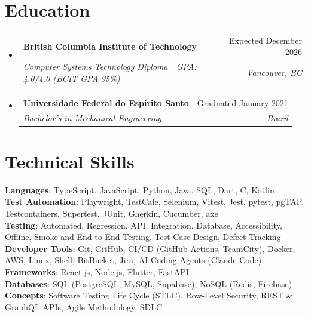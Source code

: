 \documentclass[letterpaper,11pt]{article}
\makeatletter
\newcommand{\resumeSubheading}[4]{
  \vspace{-2pt}\item
    \begin{tabular*}{0.97\textwidth}[t]{l@{\extracolsep{\fill}}r}
      \textbf{#1} & #2 \\
      \textit{\small#3} & \textit{\small #4} \\
    \end{tabular*}\vspace{-7pt}
}
\newcommand{\resumeSubHeadingListStart}{\begin{itemize}[leftmargin=0.15in, label={}]}
\newcommand{\resumeSubHeadingListEnd}{\end{itemize}}
\makeatother
\begin{document}
\section{Education}
  \resumeSubHeadingListStart
    \resumeSubheading
      {British Columbia Institute of Technology}{Expected December 2026}
      {Computer Systems Technology Diploma $|$ \textup{GPA: 4.0/4.0 (BCIT GPA 95\%)}}{Vancouver, BC}
    \resumeSubheading
      {Universidade Federal do Espirito Santo}{Graduated January 2021}
      {Bachelor's in Mechanical Engineering}{Brazil}
  \resumeSubHeadingListEnd


%
\section{Technical Skills}
 \begin{itemize}[leftmargin=0.15in, label={}]
    \small{\item{
     \textbf{Languages}{: TypeScript, JavaScript, Python, Java, SQL, Dart, C, Kotlin} \\

    \textbf{Test Automation}{: Playwright, TestCafe, Selenium, Vitest, Jest, pytest, pgTAP, Testcontainers, Supertest, JUnit, Gherkin, Cucumber, axe} \\

    \textbf{Testing}{: Automated, Regression, API, Integration, Database, Accessibility, Offline, Smoke and End-to-End Testing, Test Case Design, Defect Tracking} \\

    \textbf{Developer Tools}{: Git, GitHub, CI/CD (GitHub Actions, TeamCity), Docker, AWS, Linux, Shell, BitBucket, Jira, AI Coding Agents (Claude Code)} \\

    \textbf{Frameworks}{: React.js, Node.js, Flutter, FastAPI} \\

    \textbf{Databases}{: SQL (PostgreSQL, MySQL, Supabase), NoSQL (Redis, Firebase)} \\

    \textbf{Concepts}{: Software Testing Life Cycle (STLC), Row-Level Security, REST \& GraphQL APIs, Agile Methodology, SDLC}
    }}
 \end{itemize}


\end{document}
